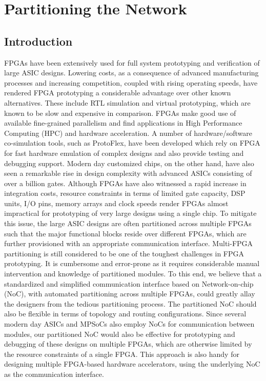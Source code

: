 \chapter{Partitioning the Network}
\label{chapter3}
\section {Introduction}

FPGAs have been extensively used for full system prototyping and verification of large ASIC designs. Lowering costs, as a consequence of advanced manufacturing processes and increasing competition, coupled with rising operating speeds, have rendered FPGA prototyping a considerable advantage over other known alternatives. These include RTL simulation and virtual prototyping, which are known to be slow and expensive in comparison. FPGAs make good use of available fine-grained parallelism and find applications in High Performance Computing (HPC) and hardware acceleration. A number of hardware/software co-simulation tools, such as ProtoFlex, have been developed which rely on FPGA for fast hardware emulation of complex designs and also provide testing and debugging support. Modern day customized chips, on the other hand, have also seen a remarkable rise in design complexity with advanced ASICs consisting of over a billion gates. Although FPGAs have also witnessed a rapid increase in integration costs, resource constraints in terms of limited gate capacity, DSP units, I/O pins, memory arrays and clock speeds render FPGAs almost impractical for prototyping of very large designs using a single chip. To mitigate this issue, the large ASIC designs are often partitioned across multiple FPGAs such that the major functional blocks reside over different FPGAs, which are further provisioned with an appropriate communication interface. Multi-FPGA partitioning is still considered to be one of the toughest challenges in FPGA prototyping. It is cumbersome and error-prone as it requires considerable manual intervention and knowledge of partitioned modules. To this end, we believe that a standardized and simplified communication interface based on Network-on-chip (NoC), with automated partitioning across multiple FPGAs, could greatly allay the designers from the tedious partitioning process. The partitioned NoC should also be flexible in terms of topology and routing configurations. Since several modern day ASICs and MPSoCs also employ NoCs for communication between modules, our partitioned NoC would also be effective for prototyping and debugging of these designs on multiple FPGAs, which are otherwise limited by the resource constraints of a single FPGA. This approach is also handy for designing multiple FPGA-based hardware accelerators, using the underlying NoC as the communication interface.\\
